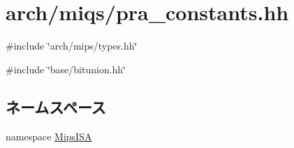\hypertarget{miqs_2pra__constants_8hh}{
\section{arch/miqs/pra\_\-constants.hh}
\label{miqs_2pra__constants_8hh}
}
{\ttfamily \#include \char`\"{}arch/mips/types.hh\char`\"{}}\par
{\ttfamily \#include \char`\"{}base/bitunion.hh\char`\"{}}\par
\subsection*{ネームスペース}
\begin{DoxyCompactItemize}
\item 
namespace \hyperlink{namespaceMipsISA}{MipsISA}
\end{DoxyCompactItemize}
